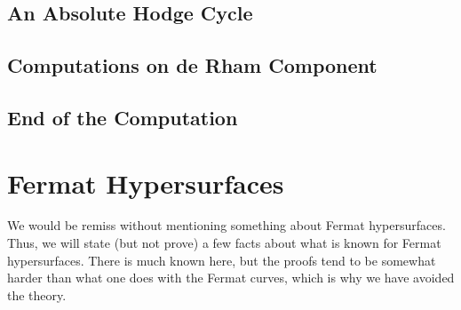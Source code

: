 \documentclass[../thesis.tex]{subfiles}
\begin{document}
\subsection{An Absolute Hodge Cycle}

\subsection{Computations on de Rham Component}

\subsection{End of the Computation}

\section{Fermat Hypersurfaces}
We would be remiss without mentioning something about Fermat hypersurfaces. Thus, we will state (but not prove) a few facts about what is known for Fermat hypersurfaces. There is much known here, but the proofs tend to be somewhat harder than what one does with the Fermat curves, which is why we have avoided the theory.\todo{}
\end{document}
